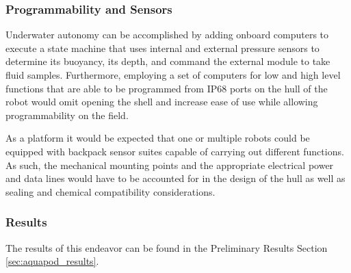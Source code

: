 	\subsubsection{Programmability and Sensors}

	Underwater autonomy can be accomplished by adding onboard computers to execute a state machine that uses internal and external pressure sensors to determine its buoyancy, its depth, and command the external module to take fluid samples. Furthermore, employing a set of computers for low and high level functions that are able to be programmed from IP68 ports on the hull of the robot would omit opening the shell and increase ease of use while allowing programmability on the field. 

	As a platform it would be expected that one or multiple robots could be equipped with backpack sensor suites capable of carrying out different functions. As such, the mechanical mounting points and the appropriate electrical power and data lines would have to be accounted for in the design of the hull as well as sealing and chemical compatibility considerations. 

	\subsubsection{Results}

	The results of this endeavor can be found in the Preliminary Results Section \ref{sec:aquapod_results}. 




